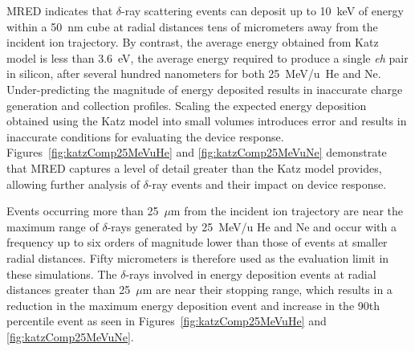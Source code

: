 MRED indicates that $\delta$-ray scattering events can deposit up to 10~keV of energy within a 50~nm cube at radial distances tens of micrometers away from the incident ion trajectory.
By contrast, the average energy obtained from Katz model is less than 3.6~eV, the average energy required to produce a single \emph{eh} pair in silicon, after several hundred nanometers for both 25~MeV/u~He and Ne.
Under-predicting the magnitude of energy deposited results in inaccurate charge generation and collection profiles.
Scaling the expected energy deposition obtained using the Katz model into small volumes introduces error and results in inaccurate conditions for evaluating the device response.
Figures~\ref{fig:katzComp25MeVuHe} and \ref{fig:katzComp25MeVuNe} demonstrate that MRED captures a level of detail greater than the Katz model provides, allowing further analysis of $\delta$-ray events and their impact on device response.

Events occurring more than 25~$\mu$m from the incident ion trajectory
are near the maximum range of $\delta$-rays generated by 25~MeV/u He 
and Ne and occur with a frequency up to six orders of magnitude lower 
than those of events at smaller radial distances.
Fifty micrometers is therefore used as the evaluation limit in these simulations.
The $\delta$-rays involved in energy deposition events at radial
distances greater than 25~$\mu$m are near their stopping range, 
which results in
a reduction in the maximum energy deposition event and increase in 
the 90th percentile event as seen in Figures~\ref{fig:katzComp25MeVuHe}
and \ref{fig:katzComp25MeVuNe}.

